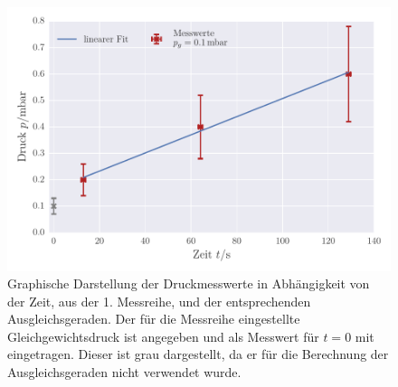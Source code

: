 \begin{figure}[!h]
 \centering
 \includegraphics[scale=0.8]{../Grafiken/Leckrate_Drehschieber_0.pdf}
 \caption{Graphische Darstellung der Druckmesswerte in Abhängigkeit von der Zeit, aus der 1. Messreihe, und der
 	entsprechenden Ausgleichsgeraden. Der für die Messreihe eingestellte Gleichgewichtsdruck ist angegeben und als Messwert für $t=0$ mit eingetragen. Dieser ist grau dargestellt, da er für die 
 	Berechnung der Ausgleichsgeraden nicht verwendet wurde. \label{fig:leckrate_drehschieber_0}}
 \end{figure} 